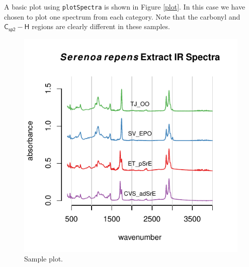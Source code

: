 \documentclass[letter,10pt,twocolumn,twoside,printwatermark=false]{pinp}
\begin{document}
A basic plot using \texttt{plotSpectra} is shown in Figure \ref{plot}.
In this case we have chosen to plot one spectrum from each category.
Note that the carbonyl and \(\mathsf{{C_{sp2}-H}}\) regions are clearly
different in these samples.

\begin{Shaded}
\begin{Highlighting}[]
\StringTok{ }\NormalTok{(}
  \OperatorTok{~}
\StringTok{  }\OperatorTok{~}
\StringTok{  }\OperatorTok{~}\OperatorTok{~}
   \NormalTok{(}\NormalTok{, }\NormalTok{, }\NormalTok{, }\NormalTok{),}
   \NormalTok{(}\NormalTok{, }\NormalTok{),}
   \NormalTok{,}
   \NormalTok{)}
\end{Highlighting}
\end{Shaded}

\begin{figure}

{\centering \includegraphics{ChemoSpec2_files/figure-latex/Chunk8-1} 

}

\caption{\label{plot}Sample plot.}\label{fig:Chunk8}
\end{figure}
\end{document}

